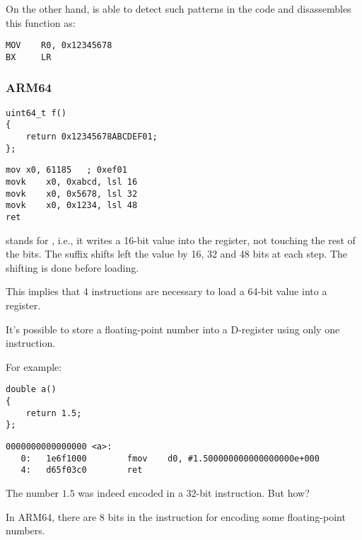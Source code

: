 On the other hand, \IDA is able to detect such patterns in the code and disassembles this function as:

\begin{lstlisting}[style=customasmARM]
MOV    R0, 0x12345678
BX     LR
\end{lstlisting}

\subsubsection{ARM64}

\begin{lstlisting}[style=customc]
uint64_t f()
{
	return 0x12345678ABCDEF01;
};
\end{lstlisting}

\begin{lstlisting}[caption=GCC 4.9.1 -O3,style=customasmARM]
mov	x0, 61185   ; 0xef01
movk	x0, 0xabcd, lsl 16
movk	x0, 0x5678, lsl 32
movk	x0, 0x1234, lsl 48
ret
\end{lstlisting}

 stands for , i.e., it writes a 16-bit value into the register, not touching the rest of the bits.
The  suffix shifts left the value by 16, 32 and 48 bits at each step. The shifting is done before loading.

This implies that 4 instructions are necessary to load a 64-bit value into a register.


It's possible to store a floating-point number into a D-register using only one instruction.

For example:

\begin{lstlisting}[style=customc]
double a()
{
	return 1.5;
};
\end{lstlisting}

\begin{lstlisting}[caption=GCC 4.9.1 -O3 + objdump,style=customasmARM]
0000000000000000 <a>:
   0:   1e6f1000        fmov    d0, #1.500000000000000000e+000
   4:   d65f03c0        ret
\end{lstlisting}

The number $1.5$ was indeed encoded in a 32-bit instruction.
But how?

In ARM64, there are 8 bits in the  instruction for encoding some floating-point numbers.

